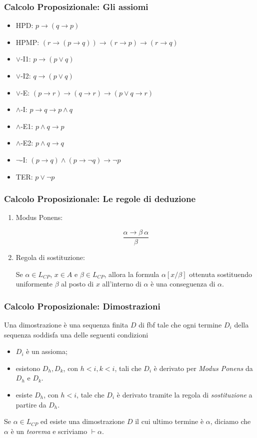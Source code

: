 \documentclass[notheorem,aspectratio=169]{beamer}
\begin{document}
\begin{frame}
\frametitle{Calcolo Proposizionale: Gli assiomi}
\begin{itemize}
\item HPD: $p \rightarrow (q \rightarrow p)$
\item HPMP: $(r \rightarrow (p \rightarrow q)) \rightarrow (r \rightarrow p) \rightarrow (r \rightarrow q)$
\item $\lor$-I1: $p \rightarrow (p \lor q)$
\item $\lor$-I2: $q \rightarrow (p \lor q)$
\item $\lor$-E: $(p \rightarrow r) \rightarrow (q \rightarrow r) \rightarrow (p \lor q \rightarrow r)$
\item $\land$-I: $p \rightarrow q \rightarrow p \land q$
\item $\land$-E1: $p \land q \rightarrow p$
\item $\land$-E2: $p \land q \rightarrow q$
\item $\neg$-I: $(p \rightarrow q) \land (p \rightarrow \neg q) \rightarrow \neg p$
\item TER: $p \lor \neg p$
\end{itemize}
\end{frame}

\begin{frame}
\frametitle{Calcolo Proposizionale: Le regole di deduzione}
\begin{enumerate}
\item Modus Ponens:

$$\frac{\alpha \rightarrow \beta \ \alpha}{\beta}$$

\item Regola di sostituzione:

Se $\alpha \in L_{CP}$, $x \in A$ e $\beta \in L_{CP}$, allora
la formula $\alpha[x/\beta]$ ottenuta sostituendo uniformente $\beta$ al posto di $x$
all'interno di $\alpha$ è una conseguenza di $\alpha$.
\end{enumerate}
\end{frame}

\begin{frame}
\frametitle{Calcolo Proposizionale: Dimostrazioni}
Una dimostrazione è una sequenza finita $D$ di fbf tale che
ogni termine $D_i$ della sequenza soddisfa una delle seguenti condizioni
\begin{itemize}
\item $D_i$ è un assioma;
\item esistono $D_h, D_k$, con $h < i, k < i$, tali che $D_i$ è derivato per \emph{Modus Ponens}
da $D_h$ e $D_k$.
\item esiste $D_h$, con $h < i$, tale che $D_i$ è derivato tramite
la regola di \emph{sostituzione} a partire da $D_h$.
\end{itemize}

Se $\alpha \in L_{CP}$ ed esiste una dimostrazione $D$ il cui ultimo termine è $\alpha$,
diciamo che $\alpha$ è un \emph{teorema} e scriviamo $\vdash \alpha$.
\end{frame}
\end{document}
